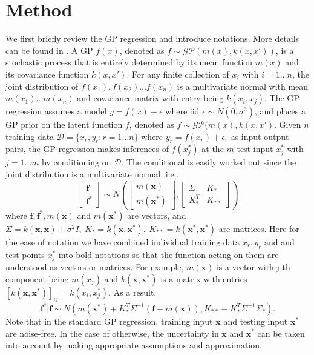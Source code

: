 \documentclass[11pt, reqno]{amsart}
\begin{document}
\section{Method} \label{sec:GP-method}
We first briefly review the GP regression and introduce notations. More details can be found in \citep{Rasmussen2006}. A GP $f(x)$, denoted as $f\sim\mathcal{GP}(m(x),k(x,x'))$, is a stochastic process that is entirely determined by its mean function $m(x)$ and its covariance function $k(x,x')$. For any finite collection of $x_{i}$ with $i=1\ldots n$, the joint distribution of $f(x_{1}),f(x_{2})\ldots f(x_{n})$ is a multivariate normal with mean $m(x_{1})\ldots m(x_{n})$ and covariance matrix with entry being $k(x_{i},x_{j})$. The GP regression assumes a model $y=f(x)+\epsilon$ where iid $\epsilon\sim N(0,\sigma^{2})$, and places a GP prior on the latent function $f$, denoted as $f\sim\mathcal{GP}(m(x),k(x,x')$. Given $n$ training data $\mathcal{D}=\{x_{r},y_{r}:r=1\ldots n\}$ where $y_{r}=f(x_{r})+\epsilon_{r}$ as input-output pairs, the GP regression makes inferences of $f(x_{j}^{*})$ at the $m$ test input $x_{j}^{*}$ with $j=1\ldots m$ by conditioning on $\mathcal{D}$. The conditional is easily worked out since the joint distribution is a multivariate normal, i.e., 
\[
\begin{bmatrix}\mathbf{f}\\
\mathbf{f}^{*}
\end{bmatrix}\sim N(\begin{bmatrix}m(\mathbf{x})\\
m(\mathbf{x}^{*})
\end{bmatrix},\begin{bmatrix}\Sigma & K_{*}\\
K_{*}^{T} & K_{**}
\end{bmatrix})
\]
where $\mathbf{f},\mathbf{f}^{*},m(\mathbf{x})$ and $m(\mathbf{x}^{*})$ are vectors, and $\Sigma=k(\mathbf{x},\mathbf{x})+\sigma^{2}I,\ K_{*}=k(\mathbf{x},\mathbf{x}^{*}),\ K_{**}=k(\mathbf{x}^{*},\mathbf{x}^{*})$ are matrices. Here for the ease of notation we have combined individual training data $x_{r},y_{r}$ and and test points $x_{j}^{*}$ into bold notations so that the function acting on them are understood as vectors or matrices. For example, $m(\mathbf{x})$ is a vector with j-th component being $m(x_{j})$ and $k(\mathbf{x},\mathbf{x}^{*})$ is a matrix with entries $[k(\mathbf{x},\mathbf{x}^{*})]_{ij}=k(x_{i},x_{j}^{*})$. As a result, 
\begin{equation}
\mathbf{f}^{*}\vert\mathbf{f}\sim N(m(\mathbf{x}^{*})+K_{*}^{T}\Sigma^{-1}(\mathbf{f}-m(\mathbf{x})),K_{**}-K_{*}^{T}\Sigma^{-1}\Sigma_{*}). \label{eq:f|f*}
\end{equation}
Note that in the standard GP regression, training input $\mathbf{x}$ and testing input $\mathbf{x}^{*}$ are noise-free. In the case of otherwise, the uncertainty in $\mathbf{x}$ and $\mathbf{x}^{*}$ can be taken into account by making appropriate assumptions and approximation. 
\end{document}
